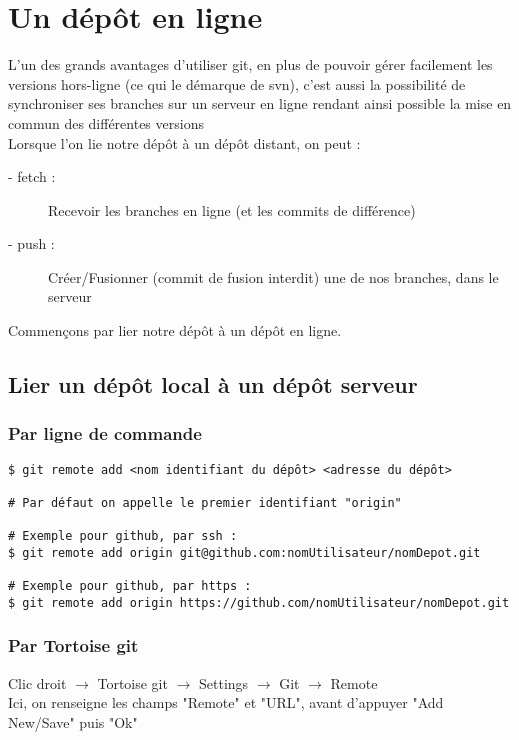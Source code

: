\newpage
\section{Un dépôt en ligne}
L'un des grands avantages d'utiliser git, en plus de pouvoir gérer facilement les versions hors-ligne (ce qui le démarque de \acl{svn}), c'est aussi la possibilité de synchroniser ses branches sur un serveur en ligne rendant ainsi possible la mise en commun des différentes versions\\

Lorsque l'on lie notre dépôt à un dépôt distant, on peut :
\begin{description}
\item[- fetch :]Recevoir les branches en ligne (et les commits de différence)
\item[- push :] Créer/Fusionner (commit de fusion interdit) une de nos branches, dans le serveur
\end{description}

Commençons par lier notre dépôt à un dépôt en ligne.

\subsection{Lier un dépôt local à un dépôt serveur}
\subsubsection{Par ligne de commande}
\begin{verbatim}
$ git remote add <nom identifiant du dépôt> <adresse du dépôt>

# Par défaut on appelle le premier identifiant "origin"

# Exemple pour github, par ssh :
$ git remote add origin git@github.com:nomUtilisateur/nomDepot.git

# Exemple pour github, par https :
$ git remote add origin https://github.com/nomUtilisateur/nomDepot.git
\end{verbatim}

\subsubsection{Par Tortoise git}
Clic droit $\rightarrow$ Tortoise git $\rightarrow$ Settings $\rightarrow$ Git $\rightarrow$ Remote\\

Ici, on renseigne les champs "Remote" et "URL", avant d'appuyer "Add New/Save" puis "Ok"\\

